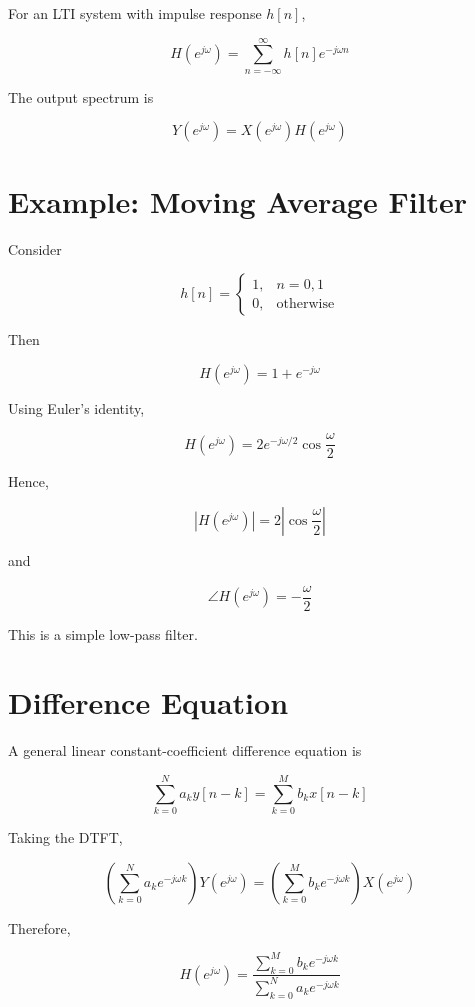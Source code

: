 For an LTI system with impulse response \(h[n]\),

\[
\boxed{
H(e^{j\omega})=
\sum_{n=-\infty}^{\infty}
h[n]e^{-j\omega n}
}
\]

The output spectrum is

\[
\boxed{
Y(e^{j\omega})=
X(e^{j\omega})H(e^{j\omega})
}
\]


\section{Example: Moving Average Filter}

Consider

\[
h[n]=
\begin{cases}
1, & n=0,1\\
0, & \text{otherwise}
\end{cases}
\]

Then

\[
H(e^{j\omega})=
1+e^{-j\omega}
\]

Using Euler’s identity,

\[
H(e^{j\omega})=
2e^{-j\omega/2}\cos\frac{\omega}{2}
\]

Hence,

\[
\boxed{
|H(e^{j\omega})|=2\left|\cos\frac{\omega}{2}\right|
}
\]

and

\[
\boxed{
\angle H(e^{j\omega})=-\frac{\omega}{2}
}
\]

This is a simple low-pass filter.


\section{Difference Equation}

A general linear constant-coefficient difference equation is

\[
\boxed{
\sum_{k=0}^{N}a_k y[n-k]
=
\sum_{k=0}^{M}b_k x[n-k]
}
\]

Taking the DTFT,

\[
\left(
\sum_{k=0}^{N}a_k e^{-j\omega k}
\right)
Y(e^{j\omega})
=
\left(
\sum_{k=0}^{M}b_k e^{-j\omega k}
\right)
X(e^{j\omega})
\]

Therefore,

\[
\boxed{
H(e^{j\omega})=
\frac{\sum_{k=0}^{M}b_k e^{-j\omega k}}
{\sum_{k=0}^{N}a_k e^{-j\omega k}}
}
\]

